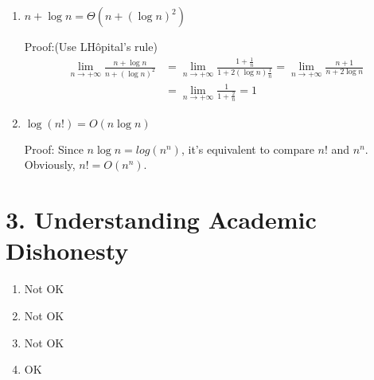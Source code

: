 \documentclass[11pt]{article}
\newenvironment{qparts}{\begin{enumerate}[{(}a{)}]}{\end{enumerate}}
\begin{document}
\begin{qparts}
\begin{enumerate}
 \item $n + \log n = \Theta(n + (\log n)^2)$
 
 Proof:(Use L\textquotesingle Hôpital's rule)
  \begin{align*}
  	\lim_{n \to+\infty} \frac{n + \log n}{n + (\log n)^2}
		&= \lim_{n \to+\infty} \frac{1 + \frac{1}{n}}{1 + 2(\log n)\frac{1}{n}} = \lim_{n \to+\infty}\frac{n +1}{n + 2\log n} \\
		&= \lim_{n \to+\infty} \frac{1}{1 + \frac{2}{n}} = 1
   \end{align*}
   
  \item $\log (n!) = O(n\log n)$
  
  Proof: Since $n\log n = log (n^n)$, it's equivalent to compare $n!$ and $n^n$. Obviously, $n! = O(n^n)$.
 
\end{enumerate}

\end{qparts}

\newpage
\section*{3. Understanding Academic Dishonesty}
\begin{qparts}
\item Not OK
\item Not OK
\item Not OK
\item OK

\end{qparts}
\end{document}
